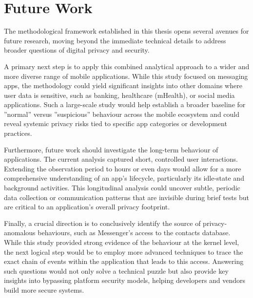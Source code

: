 \documentclass[a4paper,12pt]{report}
\begin{document}
\section{Future Work}

The methodological framework established in this thesis opens several avenues for future research, moving beyond the immediate technical details to address broader questions of digital privacy and security.

A primary next step is to apply this combined analytical approach to a wider and more diverse range of mobile applications. While this study focused on messaging apps, the methodology could yield significant insights into other domains where user data is sensitive, such as banking, healthcare (mHealth), or social media applications. Such a large-scale study would help establish a broader baseline for ”normal” versus ”suspicious” behaviour across the mobile ecosystem and could reveal systemic privacy risks tied to specific app categories or development practices.

Furthermore, future work should investigate the long-term behaviour of applications. The current analysis captured short, controlled user interactions. Extending the observation period to hours or even days would allow for a more comprehensive understanding of an app’s lifecycle, particularly its idle-state and background activities. This longitudinal analysis could uncover subtle, periodic data collection or communication patterns that are invisible during brief tests but are critical to an application’s overall privacy footprint.

Finally, a crucial direction is to conclusively identify the source of privacy-anomalous behaviours, such as Messenger’s access to the contacts database. While this study provided strong evidence of the behaviour at the kernel level, the next logical step would be to employ more advanced techniques to trace the exact chain of events within the application that leads to this access. Answering such questions would not only solve a technical puzzle but also provide key insights into bypassing platform security models, helping developers and vendors build more secure systems.
\end{document}
